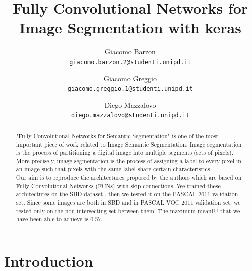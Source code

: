\documentclass[10pt,twocolumn,letterpaper]{article}
\begin{document}
\title{Fully Convolutional Networks for Image Segmentation with keras}

\author{Giacomo Barzon\\
{\tt\small giacomo.barzon.2@studenti.unipd.it}
\and
Giacomo Greggio\\
{\tt\small giacomo.greggio.1@studenti.unipd.it}
\and
Diego Mazzalovo\\
{\tt\small diego.mazzalovo@studenti.unipd.it}
}
\maketitle

\begin{abstract}
	"Fully Convolutional Networks for Semantic Segmentation"\cite{projectPaper} is one of the most important piece of work related to Image Semantic Segmentation. Image segmentation is the process of partitioning a digital image into multiple segments (sets of pixels).
	More precisely, image segmentation is the process of assigning a label to every pixel in an image such that pixels with the same label share certain characteristics\cite{wiki}. \\
	Our aim is to reproduce the architectures proposed by the authors which are based on Fully Convolutional Networks (FCNs) with skip connections.
	We trained these architectures on the SBD dataset \cite{dataset}, then we tested it on the PASCAL 2011 validation set. Since some images are both in SBD and in PASCAL VOC 2011 validation set, we tested only on the non-intersecting set between them. The maximum meanIU that we have been able to achieve is 0.57.
\end{abstract}

\section{Introduction}
\end{document}
